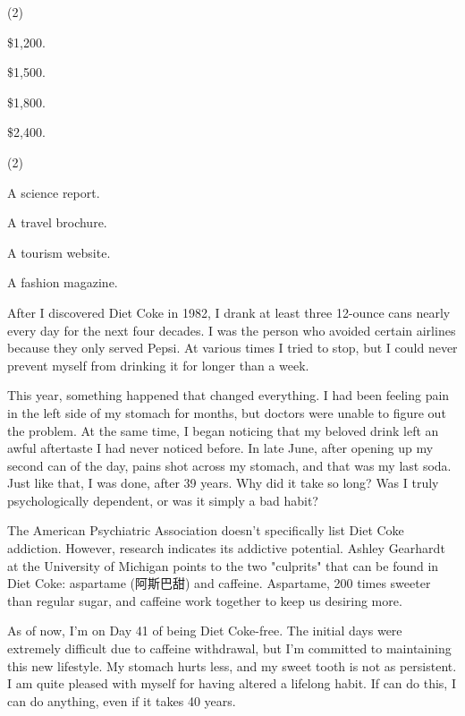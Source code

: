 \documentclass{英语试卷}
\begin{document}
\begin{choices}(2)
  \item \$1,200.
  \item \$1,500.
  \item \$1,800.
  \item \$2,400.
\end{choices}
\begin{choices}(2)
  \item A science report.
  \item A travel brochure.
  \item A tourism website.
  \item A fashion magazine.
\end{choices}
\par After I discovered Diet Coke in 1982, I drank at least three 12-ounce cans nearly every day for the next four decades. I was the person who avoided certain airlines because they only served Pepsi. At various times I tried to stop, but I could never prevent myself from drinking it for longer than a week.\par
\par This year, something happened that changed everything. I had been feeling pain in the left side of my stomach for months, but doctors were unable to figure out the problem. At the same time, I began noticing that my beloved drink left an awful aftertaste I had never noticed before. In late June, after opening up my second can of the day, pains shot across my stomach, and that was my last soda. Just like that, I was done, after 39 years. Why did it take so long? Was I truly psychologically dependent, or was it simply a bad habit?\par
\par The American Psychiatric Association doesn't specifically list Diet Coke addiction. However, research indicates its addictive potential. Ashley Gearhardt at the University of Michigan points to the two "culprits" that can be found in Diet Coke: aspartame (阿斯巴甜) and caffeine. Aspartame, 200 times sweeter than regular sugar, and caffeine work together to keep us desiring more.\par
\par As of now, I'm on Day 41 of being Diet Coke-free. The initial days were extremely difficult due to caffeine withdrawal, but I'm committed to maintaining this new lifestyle. My stomach hurts less, and my sweet tooth is not as persistent. I am quite pleased with myself for having altered a lifelong habit. If can do this, I can do anything, even if it takes 40 years.\par
\end{document}
